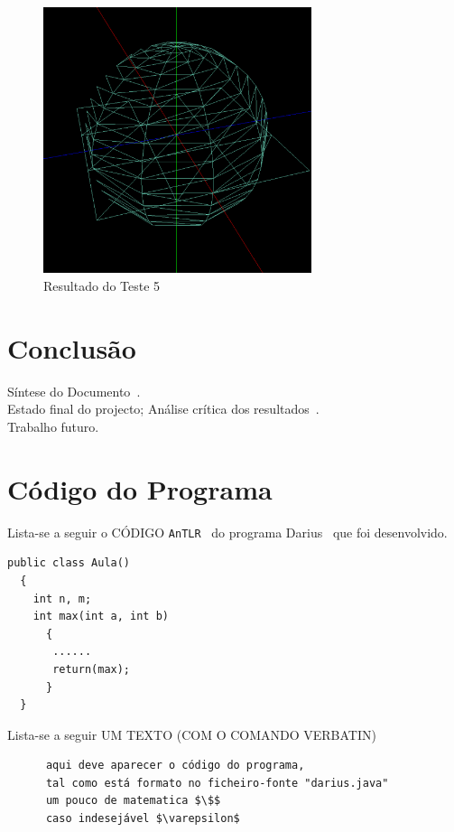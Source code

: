 \documentclass[11pt,a4paper]{report}%
\def\darius{\textsf{Darius}\xspace}
\def\antlr{\texttt{AnTLR}\xspace}
\begin{document}
\begin{figure}[H]
	\centering
	\includegraphics[width=0.7\textwidth]{images/sphere_plane.png}
	\caption{Resultado do Teste 5} \label{fig:sphere_plane}
\end{figure}


\chapter{Conclusão} \label{concl}
Síntese do Documento~\cite{araujo:2018,martini:2018}.\\
Estado final do projecto; Análise crítica dos resultados~\cite{Sto77a}.\\
Trabalho futuro.

\appendix %
\chapter{Código do Programa}

Lista-se a seguir o CÓDIGO \antlr~\cite{antlr:2016} do programa
\darius~\cite{maskin:1985} que foi desenvolvido.
\begin{verbatim}
public class Aula()
  {
    int n, m;
    int max(int a, int b)
      {
       ......
       return(max);
      }
  }
\end{verbatim}

Lista-se a seguir UM TEXTO (COM O COMANDO VERBATIN)
\begin{verbatim}
      aqui deve aparecer o código do programa,
      tal como está formato no ficheiro-fonte "darius.java"
      um pouco de matematica $\$$
      caso indesejável $\varepsilon$
\end{verbatim}
\end{document}
